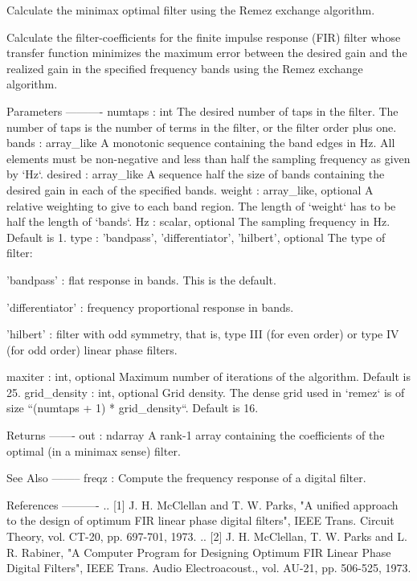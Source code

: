 \begin{DoxyVerb}Calculate the minimax optimal filter using the Remez exchange algorithm.

Calculate the filter-coefficients for the finite impulse response
(FIR) filter whose transfer function minimizes the maximum error
between the desired gain and the realized gain in the specified
frequency bands using the Remez exchange algorithm.

Parameters
----------
numtaps : int
    The desired number of taps in the filter. The number of taps is
    the number of terms in the filter, or the filter order plus one.
bands : array_like
    A monotonic sequence containing the band edges in Hz.
    All elements must be non-negative and less than half the sampling
    frequency as given by `Hz`.
desired : array_like
    A sequence half the size of bands containing the desired gain
    in each of the specified bands.
weight : array_like, optional
    A relative weighting to give to each band region. The length of
    `weight` has to be half the length of `bands`.
Hz : scalar, optional
    The sampling frequency in Hz. Default is 1.
type : {'bandpass', 'differentiator', 'hilbert'}, optional
    The type of filter:

      'bandpass' : flat response in bands. This is the default.

      'differentiator' : frequency proportional response in bands.

      'hilbert' : filter with odd symmetry, that is, type III
                  (for even order) or type IV (for odd order)
                  linear phase filters.

maxiter : int, optional
    Maximum number of iterations of the algorithm. Default is 25.
grid_density : int, optional
    Grid density. The dense grid used in `remez` is of size
    ``(numtaps + 1) * grid_density``. Default is 16.

Returns
-------
out : ndarray
    A rank-1 array containing the coefficients of the optimal
    (in a minimax sense) filter.

See Also
--------
freqz : Compute the frequency response of a digital filter.

References
----------
.. [1] J. H. McClellan and T. W. Parks, "A unified approach to the
       design of optimum FIR linear phase digital filters",
       IEEE Trans. Circuit Theory, vol. CT-20, pp. 697-701, 1973.
.. [2] J. H. McClellan, T. W. Parks and L. R. Rabiner, "A Computer
       Program for Designing Optimum FIR Linear Phase Digital
       Filters", IEEE Trans. Audio Electroacoust., vol. AU-21,
       pp. 506-525, 1973.


\end{DoxyVerb}
